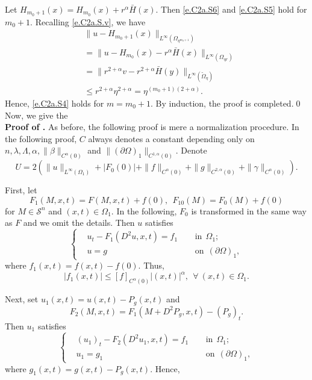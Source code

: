 \documentclass[preprint,12pt]{elsarticle}
\theoremstyle{definition}
\theoremstyle{remark}
\numberwithin{equation}{section}
\begin{document}
Let $H_{m_0+1}(x)=H_{m_0}(x)+r^{\alpha}\bar H(x)$. Then \cref{e.C2a.S6} and \cref{e.C2a.S5} hold for $m_0+1$. Recalling \cref{e.C2a.S.v}, we have
\begin{equation*}
  \begin{aligned}
&\|u-H_{m_0+1}(x)\|_{L^{\infty}(\Omega_{\eta^{m_0+1}})}\\
&= \|u-H_{m_0}(x)-r^{\alpha}\bar H(x)\|_{L^{\infty}(\Omega_{\eta r})}\\
&= \|r^{2+\alpha}v-r^{2+\alpha}\bar H(y)\|_{L^{\infty}(\tilde{\Omega}_{\eta})}\\
&\leq r^{2+\alpha}\eta^{2+\alpha}=\eta^{(m_0+1)(2+\alpha)}.
  \end{aligned}
\end{equation*}
Hence, \cref{e.C2a.S4} holds for $m=m_0+1$. By induction, the proof is completed.\qed~\\

Now, we give the~\\
\noindent\textbf{Proof of .} As before, the following proof is mere a normalization procedure. In the following proof, $C$ always denotes a constant depending only on $n,\lambda,\Lambda,\alpha,\|\beta\|_{C^{\alpha}(0)}$ and $\|(\partial \Omega)_1\|_{C^{1,\alpha}(0)}$. Denote
\begin{equation*}
U=2(\|u\|_{L^{\infty}(\Omega_1)}+|F_0(0)|+\|f\|_{C^{\alpha}(0)}+\|g\|_{C^{2,\alpha}(0)}
+\|\gamma\|_{C^{\alpha}(0)}).
\end{equation*}

First, let
\begin{equation*}
F_1(M,x,t)=F(M,x,t)+f(0),~~ F_{10}(M)=F_0(M)+f(0)
\end{equation*}
for $M \in \mathcal{S}^n$ and $(x,t)\in \Omega_1$. In the following, $F_0$ is transformed in the same way as $F$ and we omit the details. Then $u$ satisfies
\begin{equation*}
\left\{\begin{aligned}
&u_t-F_1(D^2u,x,t)=f_1&& ~~\mbox{in}~~\Omega_1;\\
&u=g&& ~~\mbox{on}~~(\partial \Omega)_1,
\end{aligned}\right.
\end{equation*}
where $f_1(x,t)=f(x,t)-f(0)$. Thus,
\begin{equation*}
  |f_1(x,t)|\leq [f]_{C^{\alpha}(0)}|(x,t)|^{\alpha}, ~~\forall ~(x,t)\in \Omega_1.
\end{equation*}

Next, set $u_1(x,t)=u(x,t)-P_g(x,t)$ and
\begin{equation*}
F_2(M,x,t)=F_1(M+D^{2}P_g,x,t)-(P_g)_t.
\end{equation*}
Then $u_1$ satisfies
\begin{equation*}
\left\{\begin{aligned}
&(u_1)_t-F_2(D^2u_1,x,t)=f_1&& ~~\mbox{in}~~\Omega_1;\\
&u_1=g_1&& ~~\mbox{on}~~(\partial \Omega)_1,
\end{aligned}\right.
\end{equation*}
where $g_1(x,t)=g(x,t)-P_g(x,t)$. Hence,
\end{document}
